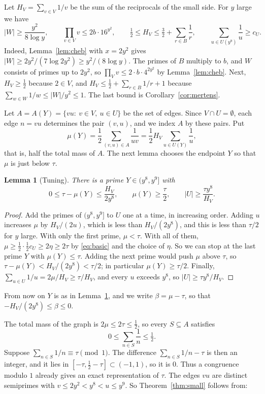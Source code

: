 \documentclass[11pt]{amsart}
\newtheorem{lemma}[theorem]{Lemma}
\theoremstyle{definition}
\theoremstyle{remark}
\begin{document}
Let $H_V=\sum_{v\in V}1/v$ be the sum of the reciprocals of the small side. For $y$ large we have
\begin{equation}\label{eq:basic}
 |W|\ge\frac{y^2}{8\log y},\qquad \prod_{v\in V}v\le 2b\cdot16^{y^2},\qquad
 \tfrac12\le H_V\le\tfrac32+\sum_{r\in B}\frac1r,\qquad \sum_{u\in U(y^9)}\frac1u\ge c_U.
\end{equation}
Indeed, Lemma~\ref{lem:cheb} with $x=2y^2$ gives $|W|\ge2y^2/(7\log 2y^2)\ge y^2/(8\log y)$. The primes of $B$ multiply to $b$, and $W$ consists of primes up to $2y^2$, so $\prod_Vv\le2\cdot b\cdot4^{2y^2}$ by Lemma~\ref{lem:cheb}. Next, $H_V\ge\frac12$ because $2\in V$, and $H_V\le\frac12+\sum_{r\in B}1/r+1$ because $\sum_{w\in W}1/w\le|W|/y^2\le1$. The last bound is Corollary~\ref{cor:mertens}.

Let $A=A(Y)=\{vu:\ v\in V,\ u\in U\}$ be the set of edges. Since $V\cap U=\emptyset$, each edge $n=vu$ determines the pair $(v,u)$, and we index $A$ by these pairs. Put
\[
 \mu(Y)=\frac12\sum_{(v,u)\in A}\frac1{uv}=\frac12H_V\sum_{u\in U(Y)}\frac1u ,
\]
that is, half the total mass of $A$. The next lemma chooses the endpoint $Y$ so that $\mu$ is just below $\tau$.

\begin{lemma}[Tuning]\label{lem:tuning}
There is a prime $Y\in(y^8,y^9]$ with
\[
 0\le\tau-\mu(Y)\le\frac{H_V}{2y^8},\qquad \mu(Y)\ge\frac\tau2,\qquad |U|\ge\frac{\tau y^8}{H_V}.
\]
\end{lemma}
\begin{proof}
Add the primes of $(y^8,y^9]$ to $U$ one at a time, in increasing order. Adding $u$ increases $\mu$ by $H_V/(2u)$, which is less than $H_V/(2y^8)$, and this is less than $\tau/2$ for $y$ large. With only the first prime, $\mu<\tau$. With all of them, $\mu\ge\frac12\cdot\frac12c_U\ge2\eta\ge2\tau$ by \eqref{eq:basic} and the choice of $\eta$. So we can stop at the last prime $Y$ with $\mu(Y)\le\tau$. Adding the next prime would push $\mu$ above $\tau$, so $\tau-\mu(Y)<H_V/(2y^8)<\tau/2$; in particular $\mu(Y)\ge\tau/2$. Finally, $\sum_{u\in U}1/u=2\mu/H_V\ge\tau/H_V$, and every $u$ exceeds $y^8$, so $|U|\ge\tau y^8/H_V$.
\end{proof}

From now on $Y$ is as in Lemma~\ref{lem:tuning}, and we write $\beta=\mu-\tau$, so that $-H_V/(2y^8)\le\beta\le0$.

The total mass of the graph is $2\mu\le2\tau\le\frac12$, so every $S\subseteq A$ satisfies
\[
 0\le\sum_{n\in S}\frac1n\le\tfrac12 .
\]
Suppose $\sum_{n\in S}1/n\equiv\tau\pmod1$. The difference $\sum_{n\in S}1/n-\tau$ is then an integer, and it lies in $[-\tau,\frac12-\tau]\subset(-1,1)$, so it is $0$. Thus a congruence modulo $1$ already gives an exact representation of $\tau$. The edges $vu$ are distinct semiprimes with $v\le 2y^2<y^8<u\le y^9$. So Theorem~\ref{thm:small} follows from:
\end{document}
